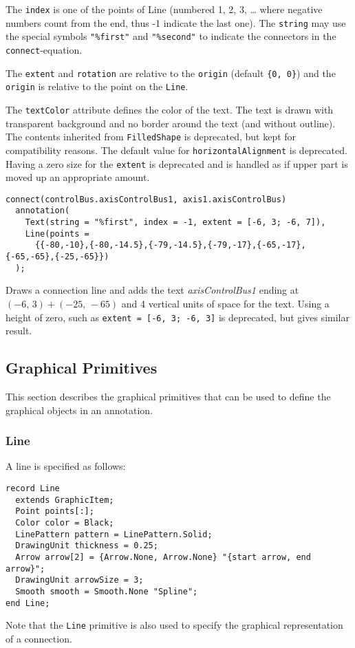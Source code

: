 The \lstinline!index! is one of the points of Line (numbered 1, 2, 3, \ldots{} where negative numbers count from the end, thus -1 indicate the last one).
The \lstinline!string! may use the special symbols \lstinline!"%first"! and \lstinline!"%second"! to indicate the connectors in the \lstinline!connect!-equation.

The \lstinline!extent! and \lstinline!rotation! are relative to the \lstinline!origin! (default \lstinline!{0, 0}!) and the \lstinline!origin! is relative to the point on the \lstinline!Line!.

The \lstinline!textColor! attribute defines the color of the text.  The text is drawn with transparent background and no border around the text (and without outline).  The contents inherited from \lstinline!FilledShape! is deprecated, but kept for compatibility reasons.  The default value for \lstinline!horizontalAlignment! is deprecated.  Having a zero size for the \lstinline!extent! is deprecated and is handled as if upper part is moved up an appropriate amount.

\begin{example}
\begin{lstlisting}[language=modelica]
connect(controlBus.axisControlBus1, axis1.axisControlBus)
  annotation(
    Text(string = "%first", index = -1, extent = [-6, 3; -6, 7]),
    Line(points =
      {{-80,-10},{-80,-14.5},{-79,-14.5},{-79,-17},{-65,-17},{-65,-65},{-25,-65}})
  );
\end{lstlisting}
Draws a connection line and adds the text \emph{axisControlBus1} ending at $(-6,\, 3) + (-25,\, -65)$ and 4 vertical units of space for the text.
Using a height of zero, such as \lstinline!extent = [-6, 3; -6, 3]! is deprecated, but gives similar result.
\end{example}

\subsection{Graphical Primitives}\label{graphical-primitives}

This section describes the graphical primitives that can be used to
define the graphical objects in an annotation.

\subsubsection{Line}\label{line}

A line is specified as follows:
\begin{lstlisting}[language=modelica]
record Line
  extends GraphicItem;
  Point points[:];
  Color color = Black;
  LinePattern pattern = LinePattern.Solid;
  DrawingUnit thickness = 0.25;
  Arrow arrow[2] = {Arrow.None, Arrow.None} "{start arrow, end arrow}";
  DrawingUnit arrowSize = 3;
  Smooth smooth = Smooth.None "Spline";
end Line;
\end{lstlisting}%
Note that the \lstinline!Line! primitive is also used to specify the graphical representation of a connection.

